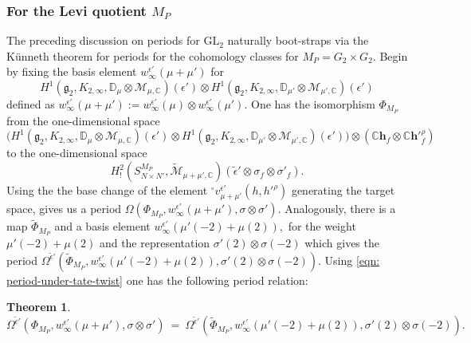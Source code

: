 \documentclass[11pt]{amsart}
\newtheorem{theorem}{Theorem}[section]
\newcommand{\C}{\mathbb C}
\newcommand{\GL}{\mathrm{GL}}
\begin{document}
\subsubsection{For the Levi quotient $M_P$}
The preceding discussion on periods for $\GL_2$ naturally boot-straps via the K\"unneth theorem for periods for the cohomology classes for 
$M_P = G_2 \times G_2.$
Begin by fixing the basis element $w^{\epsilon'}_{\infty}(\mu + \mu')$ for
$$H^{1}(\mathfrak{g}_2, K_{2, \infty}, \mathbb{D}_{\mu} \otimes \mathcal{M}_{\mu, \mathbb{C}})(\epsilon') \otimes 
H^{1}(\mathfrak{g}_2, K_{2, \infty}, \mathbb{D}_{\mu'} \otimes \mathcal{M}_{\mu', \mathbb{C}})(\epsilon')$$ 
defined as $w^{\epsilon'}_{\infty}(\mu + \mu') := w_\infty^{\epsilon'}(\mu) \otimes w^{\epsilon'}_\infty(\mu').$ 
One has the isomorphism 
$\Phi_{M_P}$ from the one-dimensional space 
$$
\biggl(
H^{1}(\mathfrak{g}_2, K_{2, \infty}, \mathbb{D}_{\mu} \otimes \mathcal{M}_{\mu, \mathbb{C}})(\epsilon') \otimes 
H^{1}(\mathfrak{g}_2, K_{2, \infty}, \mathbb{D}_{\mu'} \otimes \mathcal{M}_{\mu', \mathbb{C}})(\epsilon')
\biggr) \otimes 
(\C \mathbf{h}_f \otimes \C \mathbf{h}'^\rho_f)
$$
to the one-dimensional space
$$
H_{!}^2 (S^{M_P}_{N \times N'}, \widetilde{\mathcal{M}}_{\mu + \mu', \mathbb{C}}) (\tilde{\epsilon}' \otimes {}\sigma_f  \otimes {}\sigma'_f). 
$$
Using the the base change of the element ${^\circ}v^{\epsilon'}_{\mu + \mu'}(h,h'^\rho)$ generating the target space, 
gives us a period $\Omega(\Phi_{M_P}, w^{\epsilon'}_{\infty}(\mu + \mu'), {}\sigma   \otimes {}\sigma' ).$ 
Analogously, there is a map $\widetilde{\Phi}_{M_P}$ and a basis element $w^{\epsilon'}_{\infty}(\mu'(-2)+ \mu(2)),$ for the weight $\mu'(-2) + \mu(2)$ and the representation $\sigma'(2)\otimes \sigma(-2)$ which gives the period $\Omega^{\tilde{\epsilon}'}(\widetilde{\Phi}_{M_P}, w^{\epsilon'}_{\infty}(\mu'(-2)+ \mu(2)),  {}\sigma'(2) \otimes {}\sigma(-2) ).$
Using \eqref{eqn: period-under-tate-twist} one has the following period relation: 

\begin{theorem}
\label{thm: periods-are-equal}
$$
\Omega^{\tilde{\epsilon}'}(\Phi_{M_P}, w^{\epsilon'}_{\infty}(\mu + \mu'), {}\sigma   \otimes {}\sigma') \ = \ 
\Omega^{\tilde{\epsilon}'}(\widetilde{\Phi}_{M_P}, w^{\epsilon'}_{\infty}(\mu'(-2)+ \mu(2)),  {}\sigma'(2) \otimes {}\sigma(-2) ).
$$
\end{theorem}

  
\medskip
\end{document}
